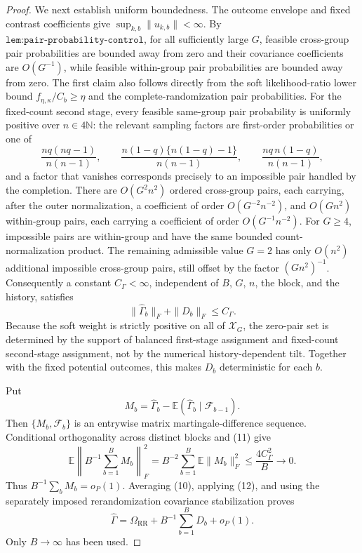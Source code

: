 \documentclass{article}
\begin{document}
\begin{proof}
We next establish uniform boundedness.  The outcome envelope and fixed contrast coefficients give \(\sup_{k,b}\|u_{k,b}\|<\infty\).  By \(\texttt{lem:pair-probability-control}\), for all sufficiently large \(G\), feasible cross-group pair probabilities are bounded away from zero and their covariance coefficients are \(O(G^{-1})\), while feasible within-group pair probabilities are bounded away from zero.  The first claim also follows directly from the soft likelihood-ratio lower bound \(f_{\eta,\kappa}/C_b\geq\eta\) and the complete-randomization pair probabilities.  For the fixed-count second stage, every feasible same-group pair probability is uniformly positive over \(n\in4\mathbb N\): the relevant sampling factors are first-order probabilities or one of
\[
 \frac{nq(nq-1)}{n(n-1)},\qquad
 \frac{n(1-q)\{n(1-q)-1\}}{n(n-1)},\qquad
 \frac{nq\,n(1-q)}{n(n-1)},
\]
and a factor that vanishes corresponds precisely to an impossible pair handled by the completion.  There are \(O(G^2n^2)\) ordered cross-group pairs, each carrying, after the outer normalization, a coefficient of order \(O(G^{-2}n^{-2})\), and \(O(Gn^2)\) within-group pairs, each carrying a coefficient of order \(O(G^{-1}n^{-2})\).  For \(G\geq4\), impossible pairs are within-group and have the same bounded count-normalization product.  The remaining admissible value \(G=2\) has only \(O(n^2)\) additional impossible cross-group pairs, still offset by the factor \((Gn^2)^{-1}\).  Consequently a constant \(C_\Gamma<\infty\), independent of \(B\), \(G\), \(n\), the block, and the history, satisfies
\[
 \|\widehat\Gamma_b\|_F+\|D_b\|_F\leq C_\Gamma.           \tag{11}
\]
Because the soft weight is strictly positive on all of \(\mathcal X_G\), the zero-pair set is determined by the support of balanced first-stage assignment and fixed-count second-stage assignment, not by the numerical history-dependent tilt.  Together with the fixed potential outcomes, this makes \(D_b\) deterministic for each \(b\).

Put
\[
 M_b=\widehat\Gamma_b-
     \mathbb E(\widehat\Gamma_b\mid\mathcal F_{b-1}).
\]
Then \(\{M_b,\mathcal F_b\}\) is an entrywise matrix martingale-difference sequence.  Conditional orthogonality across distinct blocks and (11) give
\[
 \mathbb E\left\|B^{-1}\sum_{b=1}^BM_b\right\|_F^2
 =B^{-2}\sum_{b=1}^B\mathbb E\|M_b\|_F^2
 \leq\frac{4C_\Gamma^2}{B}\longrightarrow0.                \tag{12}
\]
Thus \(B^{-1}\sum_bM_b=o_P(1)\).  Averaging (10), applying (12), and using the separately imposed rerandomization covariance stabilization proves
\[
 \widehat\Gamma
 =\Omega_{\mathrm{RR}}+B^{-1}\sum_{b=1}^BD_b+o_P(1).       \tag{13}
\]
Only \(B\to\infty\) has been used.


\end{proof}
\end{document}
